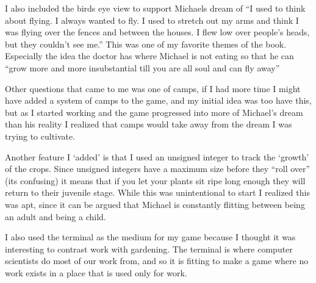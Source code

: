 \documentclass{article}
\begin{document}
I also included the birds eye view to support Michaels dream of ``I used to think about flying. I always wanted to fly. I used to stretch out my arms and think I was flying over the fences and between the houses. I flew low over people's heads, but they couldn't see me.'' This was one of my favorite themes of the book. Especially the idea the doctor has where Michael is not eating so that he can ``grow more and more insubstantial till you are all soul and can fly away'' 

Other questions that came to me was one of camps, if I had more time I might have added a system of camps to the game, and my initial idea was too have this, but as I started working and the game progressed into more of Michael's dream than his reality I realized that camps would take away from the dream I was trying to cultivate. 

Another feature I `added' is that I used an unsigned integer to track the `growth' of the crops. Since unsigned integers have a maximum size before they ``roll over'' (its confusing) it means that if you let your plants sit ripe long enough they will return to their juvenile stage. While this was unintentional to start I realized this was apt, since it can be argued that Michael is constantly flitting between being an adult and being a child.

I also used the terminal as the medium for my game because I thought it was interesting to contrast work with gardening. The terminal is where computer scientists do most of our work from, and so it is fitting to make a game where no work exists in a place that is used only for work. 
\end{document}
